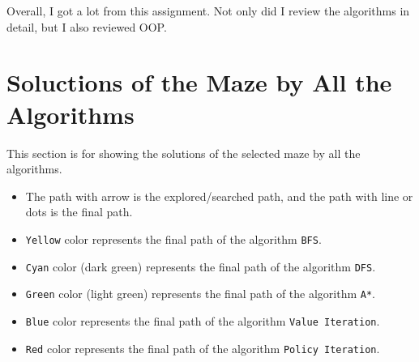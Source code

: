 \documentclass{article}
\begin{document}
Overall, I got a lot from this assignment. Not only did I review the algorithms in detail, but I also reviewed OOP.

\section{Soluctions of the Maze by All the Algorithms}
This section is for showing the solutions of the selected maze by all the algorithms.

\begin{itemize}
    \item The path with arrow is the explored/searched path, and the path with line or dots is the final path.
    \item \texttt{Yellow} color represents the final path of the algorithm \texttt{BFS}.
    \item \texttt{Cyan} color (dark green) represents the final path of the algorithm \texttt{DFS}.
    \item \texttt{Green} color (light green) represents the final path of the algorithm \texttt{A*}.
    \item \texttt{Blue} color represents the final path of the algorithm \texttt{Value Iteration}.
    \item \texttt{Red} color represents the final path of the algorithm \texttt{Policy Iteration}.
\end{itemize}
\end{document}
